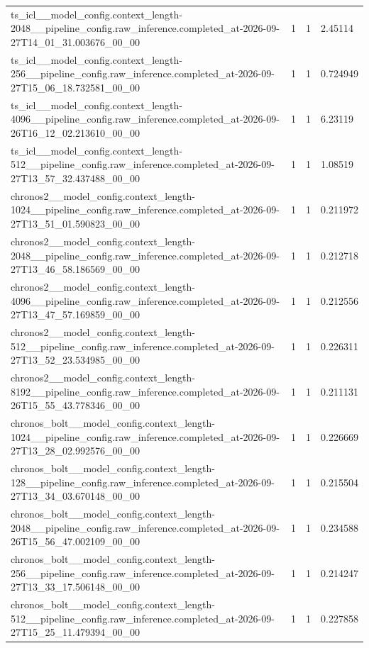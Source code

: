\begin{tabular}{llll}
ts\_icl\_\_model\_config.context\_length-2048\_\_pipeline\_config.raw\_inference.completed\_at-2026-09-27T14\_01\_31.003676\_00\_00 & 1 & 1 & 2.45114 \\
ts\_icl\_\_model\_config.context\_length-256\_\_pipeline\_config.raw\_inference.completed\_at-2026-09-27T15\_06\_18.732581\_00\_00 & 1 & 1 & 0.724949 \\
ts\_icl\_\_model\_config.context\_length-4096\_\_pipeline\_config.raw\_inference.completed\_at-2026-09-26T16\_12\_02.213610\_00\_00 & 1 & 1 & 6.23119 \\
ts\_icl\_\_model\_config.context\_length-512\_\_pipeline\_config.raw\_inference.completed\_at-2026-09-27T13\_57\_32.437488\_00\_00 & 1 & 1 & 1.08519 \\
chronos2\_\_model\_config.context\_length-1024\_\_pipeline\_config.raw\_inference.completed\_at-2026-09-27T13\_51\_01.590823\_00\_00 & 1 & 1 & 0.211972 \\
chronos2\_\_model\_config.context\_length-2048\_\_pipeline\_config.raw\_inference.completed\_at-2026-09-27T13\_46\_58.186569\_00\_00 & 1 & 1 & 0.212718 \\
chronos2\_\_model\_config.context\_length-4096\_\_pipeline\_config.raw\_inference.completed\_at-2026-09-27T13\_47\_57.169859\_00\_00 & 1 & 1 & 0.212556 \\
chronos2\_\_model\_config.context\_length-512\_\_pipeline\_config.raw\_inference.completed\_at-2026-09-27T13\_52\_23.534985\_00\_00 & 1 & 1 & 0.226311 \\
chronos2\_\_model\_config.context\_length-8192\_\_pipeline\_config.raw\_inference.completed\_at-2026-09-26T15\_55\_43.778346\_00\_00 & 1 & 1 & 0.211131 \\
chronos\_bolt\_\_model\_config.context\_length-1024\_\_pipeline\_config.raw\_inference.completed\_at-2026-09-27T13\_28\_02.992576\_00\_00 & 1 & 1 & 0.226669 \\
chronos\_bolt\_\_model\_config.context\_length-128\_\_pipeline\_config.raw\_inference.completed\_at-2026-09-27T13\_34\_03.670148\_00\_00 & 1 & 1 & 0.215504 \\
chronos\_bolt\_\_model\_config.context\_length-2048\_\_pipeline\_config.raw\_inference.completed\_at-2026-09-26T15\_56\_47.002109\_00\_00 & 1 & 1 & 0.234588 \\
chronos\_bolt\_\_model\_config.context\_length-256\_\_pipeline\_config.raw\_inference.completed\_at-2026-09-27T13\_33\_17.506148\_00\_00 & 1 & 1 & 0.214247 \\
chronos\_bolt\_\_model\_config.context\_length-512\_\_pipeline\_config.raw\_inference.completed\_at-2026-09-27T15\_25\_11.479394\_00\_00 & 1 & 1 & 0.227858 \\

\end{tabular}
